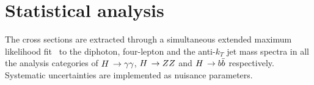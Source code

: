 \section{Statistical analysis}
\label{sec:statisticalanalysis}



The cross sections are extracted through a simultaneous extended maximum likelihood fit~\cite{Cowan:2010js} to the diphoton, four-lepton and the anti-$k_T$ jet mass spectra in all the analysis categories of $H\,\to\gamma\gamma$, $H\,\to ZZ$ and $H\,\to b\bar{b}$ respectively.
% 
Systematic uncertainties are implemented as nuisance parameters.


